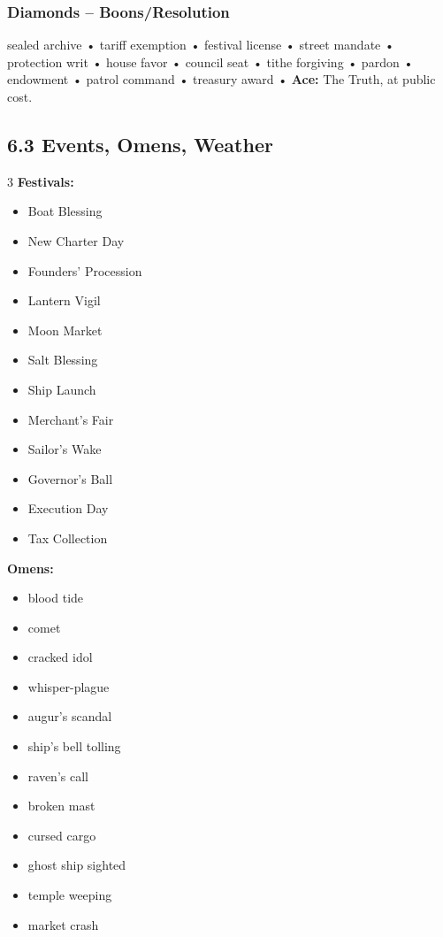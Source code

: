 \documentclass[11pt]{article}
\begin{document}
\subsubsection*{Diamonds -- Boons/Resolution}
sealed archive • tariff exemption • festival license • street mandate • protection writ • house favor • council seat • tithe forgiving • pardon • endowment • patrol command • treasury award • \textbf{Ace:} The Truth, at public cost.

\subsection*{6.3 Events, Omens, Weather}
\begin{multicols}{3}
\textbf{Festivals:}
\begin{itemize}
    \item Boat Blessing
    \item New Charter Day
    \item Founders' Procession
    \item Lantern Vigil
    \item Moon Market
    \item Salt Blessing
    \item Ship Launch
    \item Merchant's Fair
    \item Sailor's Wake
    \item Governor's Ball
    \item Execution Day
    \item Tax Collection
\end{itemize}

\textbf{Omens:}
\begin{itemize}
    \item blood tide
    \item comet
    \item cracked idol
    \item whisper-plague
    \item augur's scandal
    \item ship's bell tolling
    \item raven's call
    \item broken mast
    \item cursed cargo
    \item ghost ship sighted
    \item temple weeping
    \item market crash
\end{itemize}


\end{multicols}
\end{document}
